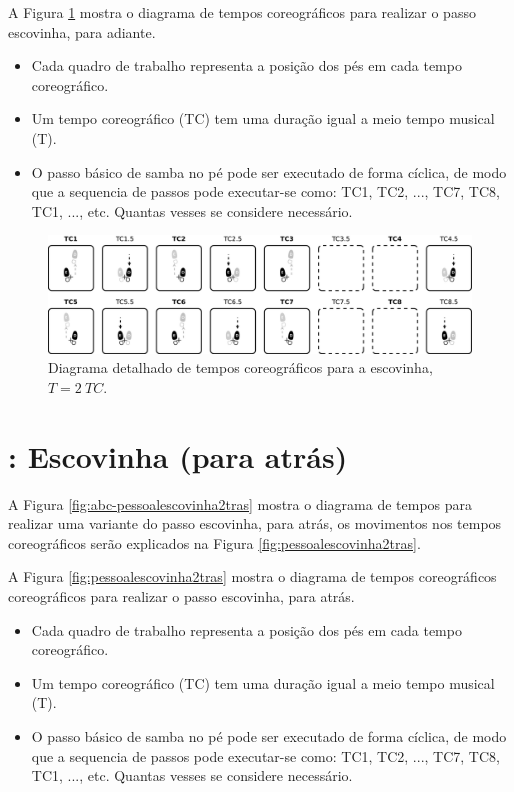 A Figura \ref{fig:pessoalescovinha2} mostra o diagrama de tempos coreográficos para realizar o passo escovinha, para adiante.
\begin{itemize}
\item Cada quadro de trabalho representa a posição dos pés em cada tempo coreográfico.
\item Um tempo coreográfico (TC) tem uma duração igual a meio tempo musical (T).
\item O passo básico de samba no pé  pode ser executado de forma cíclica, de modo que 
a sequencia de passos pode executar-se como: TC1, TC2, ..., TC7, TC8, TC1, ..., etc.  
Quantas vesses se considere necessário.
\end{itemize}


\begin{figure}
  \centering
    \includegraphics[width=\textwidth]{chapters/cap-passos-footwork/escovinha2.eps}
\caption{Diagrama detalhado de tempos coreográficos para a escovinha, $T=2~TC$.}
\label{fig:pessoalescovinha2}
\end{figure}



\section{\Variante: Escovinha (para atrás)}


A Figura \ref{fig:abc-pessoalescovinha2tras} mostra o diagrama de tempos para realizar uma variante do passo escovinha,
para atrás, os movimentos nos tempos coreográficos serão explicados na Figura \ref{fig:pessoalescovinha2tras}.


A Figura \ref{fig:pessoalescovinha2tras} mostra o diagrama de tempos coreográficos coreográficos para realizar o passo escovinha, para atrás.
\begin{itemize}
\item Cada quadro de trabalho representa a posição dos pés em cada tempo coreográfico.
\item Um tempo coreográfico (TC) tem uma duração igual a meio tempo musical (T).
\item O passo básico de samba no pé  pode ser executado de forma cíclica, de modo que 
a sequencia de passos pode executar-se como: TC1, TC2, ..., TC7, TC8, TC1, ..., etc.  
Quantas vesses se considere necessário.
\end{itemize}

